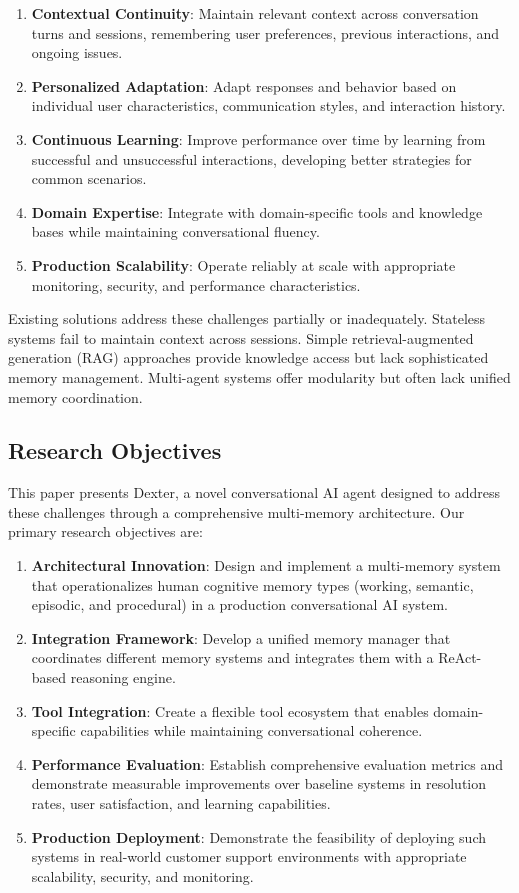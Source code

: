 \documentclass[11pt]{article}
\begin{document}
\begin{enumerate}
\item \textbf{Contextual Continuity}: Maintain relevant context across conversation turns and sessions, remembering user preferences, previous interactions, and ongoing issues.
\item \textbf{Personalized Adaptation}: Adapt responses and behavior based on individual user characteristics, communication styles, and interaction history.
\item \textbf{Continuous Learning}: Improve performance over time by learning from successful and unsuccessful interactions, developing better strategies for common scenarios.
\item \textbf{Domain Expertise}: Integrate with domain-specific tools and knowledge bases while maintaining conversational fluency.
\item \textbf{Production Scalability}: Operate reliably at scale with appropriate monitoring, security, and performance characteristics.
\end{enumerate}

Existing solutions address these challenges partially or inadequately. Stateless systems fail to maintain context across sessions. Simple retrieval-augmented generation (RAG) approaches provide knowledge access but lack sophisticated memory management. Multi-agent systems offer modularity but often lack unified memory coordination.

\subsection{Research Objectives}

This paper presents Dexter, a novel conversational AI agent designed to address these challenges through a comprehensive multi-memory architecture. Our primary research objectives are:

\begin{enumerate}
\item \textbf{Architectural Innovation}: Design and implement a multi-memory system that operationalizes human cognitive memory types (working, semantic, episodic, and procedural) in a production conversational AI system.
\item \textbf{Integration Framework}: Develop a unified memory manager that coordinates different memory systems and integrates them with a ReAct-based reasoning engine.
\item \textbf{Tool Integration}: Create a flexible tool ecosystem that enables domain-specific capabilities while maintaining conversational coherence.
\item \textbf{Performance Evaluation}: Establish comprehensive evaluation metrics and demonstrate measurable improvements over baseline systems in resolution rates, user satisfaction, and learning capabilities.
\item \textbf{Production Deployment}: Demonstrate the feasibility of deploying such systems in real-world customer support environments with appropriate scalability, security, and monitoring.
\end{enumerate}
\end{document}
